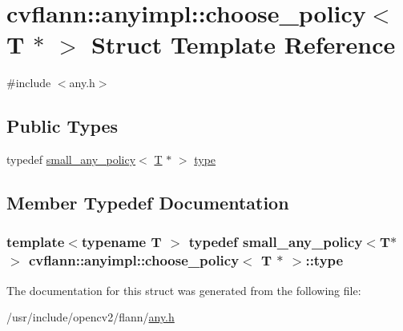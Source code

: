 \hypertarget{structcvflann_1_1anyimpl_1_1choose__policy_3_01T_01_5_01_4}{\section{cvflann\-:\-:anyimpl\-:\-:choose\-\_\-policy$<$ T $\ast$ $>$ Struct Template Reference}
\label{structcvflann_1_1anyimpl_1_1choose__policy_3_01T_01_5_01_4}
}


{\ttfamily \#include $<$any.\-h$>$}

\subsection*{Public Types}
\begin{DoxyCompactItemize}
\item 
typedef \hyperlink{structcvflann_1_1anyimpl_1_1small__any__policy}{small\-\_\-any\-\_\-policy}$<$ \hyperlink{calib3d_8hpp_a3efb9551a871ddd0463079a808916717}{T} $\ast$ $>$ \hyperlink{structcvflann_1_1anyimpl_1_1choose__policy_3_01T_01_5_01_4_a6a09e362736f35c4f0005c02befbec41}{type}
\end{DoxyCompactItemize}


\subsection{Member Typedef Documentation}
\hypertarget{structcvflann_1_1anyimpl_1_1choose__policy_3_01T_01_5_01_4_a6a09e362736f35c4f0005c02befbec41}{
\subsubsection[{type}]{\setlength{\rightskip}{0pt plus 5cm}template$<$typename T $>$ typedef {\bf small\-\_\-any\-\_\-policy}$<${\bf T}$\ast$$>$ {\bf cvflann\-::anyimpl\-::choose\-\_\-policy}$<$ {\bf T} $\ast$ $>$\-::{\bf type}}}\label{structcvflann_1_1anyimpl_1_1choose__policy_3_01T_01_5_01_4_a6a09e362736f35c4f0005c02befbec41}


The documentation for this struct was generated from the following file\-:\begin{DoxyCompactItemize}
\item 
/usr/include/opencv2/flann/\hyperlink{any_8h}{any.\-h}\end{DoxyCompactItemize}
